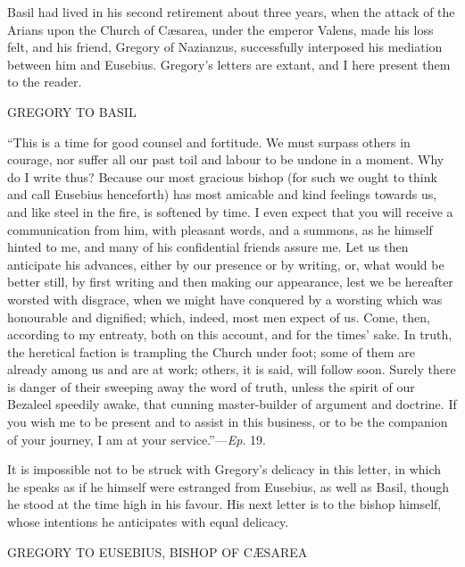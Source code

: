 Basil had lived in his second retirement about three years, when
the attack of the Arians upon the Church of Cæsarea, under the
emperor Valens, made his loss felt, and his friend, Gregory of
Nazianzus, successfully interposed his mediation between him and
Eusebius. Gregory's letters are extant, and I here present them to the
reader.

GREGORY TO BASIL

``This is a time for good counsel and fortitude. We must
surpass others in courage, nor suffer all our past toil and labour to
be undone in a moment. Why do I write thus? Because our most gracious
bishop (for such we ought to think and call Eusebius henceforth) has
most amicable and kind feelings towards us, and like steel in the
fire, is softened by time. I even expect that you will receive a
communication from him, with pleasant words, and a summons, as he
himself hinted to me, and many of his confidential friends assure me.
Let us then anticipate his advances, either by our presence or by
writing, or, what would be better still, by first writing and then
making our appearance, lest we be hereafter worsted with disgrace,
when we might have conquered by a worsting which was honourable and
dignified; which, indeed, most men expect of us. Come, then, according
to my entreaty, both on this account, and
for the times' sake. In truth, the heretical faction is trampling the
Church under foot; some of them are already among us and are at work;
others, it is said, will follow soon. Surely there is danger of their
sweeping away the word of truth, unless the spirit of our Bezaleel
speedily awake, that cunning master-builder of argument and doctrine.
If you wish me to be present and to assist in this business, or to be
the companion of your journey, I am at your service.''—\emph{Ep}.
19.

It is impossible not to be struck with Gregory's delicacy in this
letter, in which he speaks as if he himself were estranged from
Eusebius, as well as Basil, though he stood at the time high in his
favour. His next letter is to the bishop himself, whose intentions he
anticipates with equal delicacy.

GREGORY TO EUSEBIUS, BISHOP OF CÆSAREA

